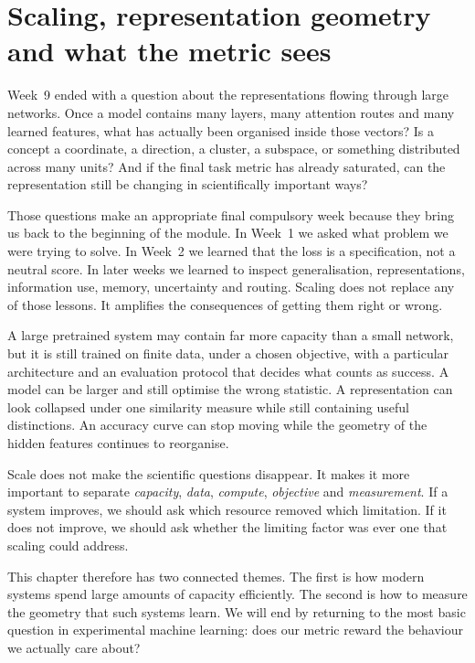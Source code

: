 \chapter{Scaling, representation geometry and what the metric sees}
\label{chap:week10}

Week~9 ended with a question about the representations flowing through large networks. Once a model contains many layers, many attention routes and many learned features, what has actually been organised inside those vectors? Is a concept a coordinate, a direction, a cluster, a subspace, or something distributed across many units? And if the final task metric has already saturated, can the representation still be changing in scientifically important ways?

Those questions make an appropriate final compulsory week because they bring us back to the beginning of the module. In Week~1 we asked what problem we were trying to solve. In Week~2 we learned that the loss is a specification, not a neutral score. In later weeks we learned to inspect generalisation, representations, information use, memory, uncertainty and routing. Scaling does not replace any of those lessons. It amplifies the consequences of getting them right or wrong.

A large pretrained system may contain far more capacity than a small network, but it is still trained on finite data, under a chosen objective, with a particular architecture and an evaluation protocol that decides what counts as success. A model can be larger and still optimise the wrong statistic. A representation can look collapsed under one similarity measure while still containing useful distinctions. An accuracy curve can stop moving while the geometry of the hidden features continues to reorganise.

\begin{keyidea}
Scale does not make the scientific questions disappear. It makes it more important to separate \emph{capacity}, \emph{data}, \emph{compute}, \emph{objective} and \emph{measurement}. If a system improves, we should ask which resource removed which limitation. If it does not improve, we should ask whether the limiting factor was ever one that scaling could address.
\end{keyidea}

This chapter therefore has two connected themes. The first is how modern systems spend large amounts of capacity efficiently. The second is how to measure the geometry that such systems learn. We will end by returning to the most basic question in experimental machine learning: does our metric reward the behaviour we actually care about?

